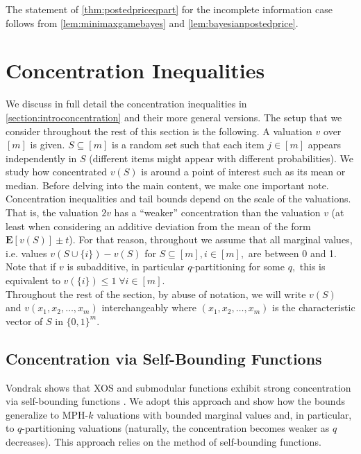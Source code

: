 \documentclass[11pt]{article}%
\numberwithin{theorem}{subsection}
\newcommand{\expect}{\mathbf{E}}
\begin{document}
\noindent
The statement of 
\cref{thm:postedpriceqpart} for the incomplete information case follows from
\cref{lem:minimaxgamebayes} and\linebreak 
\cref{lem:bayesianpostedprice}.

\section{Concentration Inequalities}
\label{section:concentration}
We discuss in full detail the concentration inequalities in \cref{section:introconcentration} and their more general versions.  The setup that we consider throughout the rest of this section is the following.
A valuation $v$ over $[m]$ is given.
$S\subseteq [m]$ is a random set such that each item $j\in [m]$ appears independently in $S$ (different items might appear with different probabilities). We study how concentrated $v(S)$ is around a point of interest such as its mean or median.  
Before delving into the main content, we make one important note. Concentration inequalities and tail bounds depend on the scale of the valuations. That is, the valuation $2v$ has a ``weaker'' concentration than the valuation $v$ (at least when considering an additive deviation from the mean of the form $\expect[v(S)]\pm t$). For that reason, throughout we assume that all marginal values, i.e. values $v(S\cup\{i\}) - v(S)$ for $S\subseteq [m], i\in [m],$ are between 0 and 1. Note that if $v$ is subadditive, in particular $q$-partitioning for some $q,$ this is equivalent to $v(\{i\})\le 1\; \forall i\in [m]$.\\

\noindent
Throughout the rest of the section, by abuse of notation, we will write $v(S)$ and $v(x_1, x_2, \ldots, x_m)$ interchangeably where $(x_1, x_2, \ldots, x_m)$ is the characteristic vector of $S$ in $\{0,1\}^m.$

\subsection{Concentration via Self-Bounding Functions}
\label{section:selfbounding}
Vondrak shows that XOS and submodular functions exhibit strong concentration via self-bounding functions \cite[Corollary 3.2]{Vondrak10}. We adopt this approach and show how the bounds generalize to MPH-$k$ valuations with bounded marginal values and, in particular, to $q$-partitioning valuations (naturally, the concentration becomes weaker as $q$ decreases). This approach relies on the method of self-bounding functions.
\end{document}
